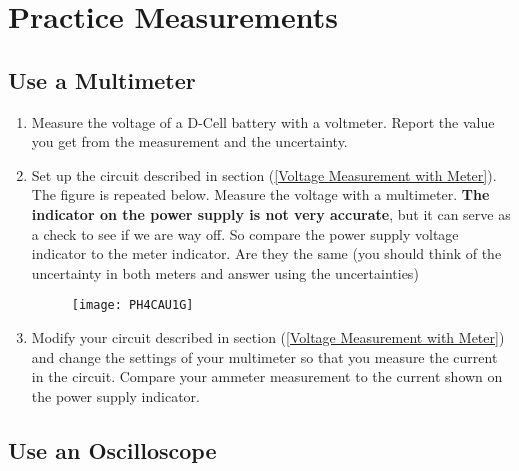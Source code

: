 \section{Practice Measurements}

\subsection{Use a Multimeter}

\begin{enumerate}
\item Measure the voltage of a D-Cell battery with a voltmeter. Report the
value you get from the measurement and the uncertainty.

\item Set up the circuit described in section (\ref{Voltage Measurement with
Meter}). The figure is repeated below. Measure the voltage with a
multimeter. \textbf{The indicator on the power supply is not very accurate},
but it can serve as a check to see if we are way off. So compare the power
supply voltage indicator to the meter indicator. Are they the same (you
should think of the uncertainty in both meters and answer using the
uncertainties)
\begin{figure}[h!]
	\centering
    \texttt{[image: PH4CAU1G]}
\end{figure}

\item Modify your circuit described in section (\ref{Voltage Measurement
with Meter}) and change the settings of your multimeter so that you measure
the current in the circuit. Compare your ammeter measurement to the current
shown on the power supply indicator.
\end{enumerate}

\subsection{Use an Oscilloscope}

